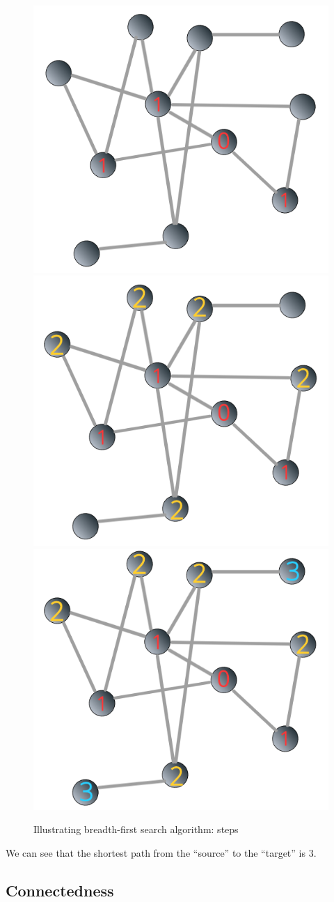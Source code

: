 \documentclass[
]{krantz}
\begin{document}
\begin{figure}

{\centering \includegraphics[width=0.5\linewidth]{images/bfs02} \includegraphics[width=0.5\linewidth]{images/bfs03} \includegraphics[width=0.5\linewidth]{images/bfs04} 

}

\caption{Illustrating breadth-first search algorithm: steps}\label{fig:bfs}
\end{figure}

We can see that the shortest path from the ``source'' to the ``target'' is \(3\).

\hypertarget{connectedness}{%
\subsection{Connectedness}\label{connectedness}}
\end{document}
